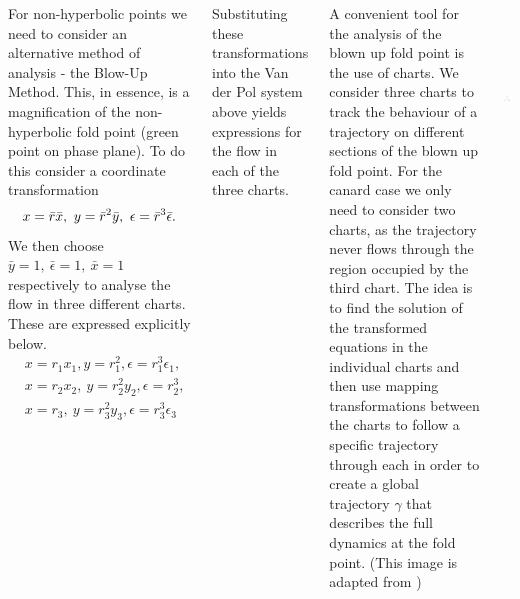 \documentclass[14pt, a0paper, portrait]{tikzposter}
\begin{document}
\begin{columns}
{
    	For non-hyperbolic points we need to consider an alternative method of analysis - the Blow-Up Method. This, in essence, is a magnification of the non-hyperbolic fold point (green point on phase plane). To do this consider a coordinate transformation
    	\begin{align*}
    	x=\Bar{r}\Bar{x}, \        y=\Bar{r}^2\Bar{y}, \ \epsilon=\bar{r}^3\bar{\epsilon}.
    	\end{align*}
    	We then choose $\bar{y}=1, \ \bar{\epsilon}=1, \ \bar{x}=1$ respectively to analyse the flow in three different charts. These are expressed explicitly below. 
    	\begin{align*}
	& x=r_1x_1, y=r_1^2,  \epsilon=r_1^3\epsilon_1, \\%
	& x=r_2x_2, \ y=r_2^2y_2, \epsilon=r_2^3, \\%
	& x=r_3, \ y=r_3^2y_3,  \epsilon=r_3^3\epsilon_3%
	\end{align*}

Substituting these transformations into the Van der Pol system above yields expressions for the flow in each of the three charts. }
{	\begin{minipage}{0.5\linewidth}

A convenient tool for the analysis of the blown up fold point is the use of charts.
We consider three charts to track the behaviour of a trajectory on different sections of the blown up fold point. For the canard case we only need to consider two charts, as the trajectory never flows through the region occupied by the third chart. The idea is to find the solution of the transformed equations in the individual charts and then use mapping transformations between the charts to follow a specific trajectory through each in order to create a global trajectory $\gamma$ that describes the full dynamics at the fold point. (This image is adapted from \cite{Kuehn})\end{minipage}	\begin{minipage}{0.5\linewidth}

\begin{tikzfigure}
    \includegraphics[height=5cm,width=6.5cm]{Images/charts-ball.jpg}
    \label{fig:my_label}
\end{tikzfigure}\end{minipage}

}
\end{columns}
\end{document}
